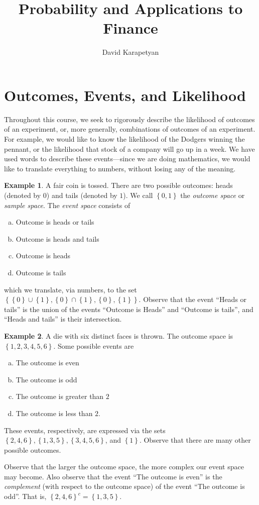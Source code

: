 \documentclass[12pt]{article}
\theoremstyle{plain}
\theoremstyle{definition}
\newtheorem*{example}{Example}
\theoremstyle{remark}
\numberwithin{equation}{section}  %
\begin{document}
\title{Probability and Applications to Finance}
\author{David Karapetyan}
\date{}
\maketitle
\newpage
\setcounter{tocdepth}{2}
\setcounter{secnumdepth}{2}
\tableofcontents
\newpage
\section{Outcomes, Events, and Likelihood}
Throughout this course, we seek to rigorously describe the likelihood of
outcomes of an experiment, or, more generally, combinations of outcomes of an 
experiment.
For example, we would like to know the likelihood of the Dodgers
winning the pennant, or the likelihood that stock of a company will go up
in a week. We have used words to describe these events---since we are doing
mathematics, we would like to translate everything to numbers, without losing
any of the meaning.
\begin{example}
	A fair coin is tossed. There are two possible outcomes: heads (denoted by 
	$0$) 
	and tails (denoted by $1$). We call $ \left\{ 0,1 \right\} $ the 
	\emph{outcome
	space} or \emph{sample space}. The \emph{event space} consists of
	\begin{enumerate}[(a)]
		\item Outcome is heads or tails
		\item Outcome is heads and tails
		\item Outcome is heads
		\item Outcome is tails
	\end{enumerate}
	which we translate, via numbers, to the set $ \left\{ \left\{ 0 \right\} 
		\cup
		\left\{ 1 \right\}, \left\{ 0 \right\} \cap \left\{ 1 \right\} , \left\{ 0
	\right\} , \left\{ 1 \right\} \right \}$.
	Observe that the event ``Heads or tails'' is the union of the events
	``Outcome is Heads'' and ``Outcome is tails'', and ``Heads and tails'' is
	their intersection.
\end{example}	

\begin{example}
	A die with six distinct faces is thrown. The outcome space is
	$ \left\{ 1, 2, 3, 4, 5, 6 \right\} $. Some possible events are
	\begin{enumerate}[(a)]
		\item The outcome is even
		\item The outcome is odd
		\item The outcome is greater than $2$
		\item The outcome is less than $2$.
	\end{enumerate}
	These events, respectively, are expressed via the sets
	$ \left\{ 2, 4, 6 \right\} , \left\{ 1,3,5 \right\} , \left\{ 3, 4, 5, 6
	\right\}$, and $\left\{ 1 \right\}$.
	Observe that there are many other possible outcomes.
\end{example}
Observe that the larger the outcome space, the more complex
our event space may become. Also observe that the event
``The outcome is even'' is the \emph{complement} (with respect to the
outcome space) of
the event ``The outcome is odd''. That is,
${\left\{ 2,4,6 \right\}}^c
= \left\{ 1,3,5 \right\}$.
\end{document}
